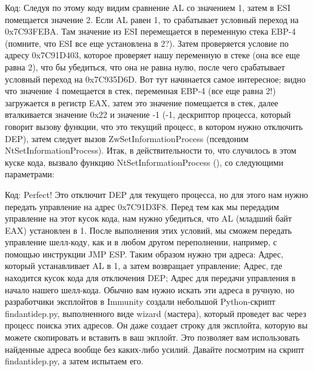\documentclass[12pt]{book}
\begin{document}
Код:
Следуя по этому коду видим сравнение AL со значением 1, затем в ESI помещается значение 2. Если AL равен 1, то срабатывает условный переход на 0x7C93FEBA. Там значение из ESI перемещается в переменную стека EBP-4 (помните, что ESI все еще установлена в 2?). Затем проверяется условие по адресу 0x7C91D403, которое проверяет нашу переменную в стеке (она все еще равна 2), что бы убедиться, что она не равна нулю, после чего срабатывает условный переход на 0x7C935D6D. Вот тут начинается самое интересное; видно что значение 4 помещается в стек, переменная EBP-4 (все еще равна 2!) загружается в регистр EAX, затем это значение помещается в стек, далее вталкивается значение 0x22 и значение -1 (-1, дескриптор процесса, который говорит вызову функции, что это текущий процесс, в котором нужно отключить DEP), затем следует вызов ZwSetInformationProcess (псевдоним NtSetInformationProcess). Итак, в действительности то, что случилось в этом куске кода, вызвало функцию NtSetInformationProcess (), со следующими параметрами:

Код:
Perfect! Это отключит DEP для текущего процесса, но для этого нам нужно передать управление на адрес 0x7C91D3F8. Перед тем как мы передадим управление на этот кусок кода, нам нужно убедиться, что AL (младший байт EAX) установлен в 1. После выполнения этих условий, мы сможем передать управление шелл-коду, как и в любом другом переполнении, например, с помощью инструкции JMP ESP. Таким образом нужно три адреса:
Адрес, который устанавливает AL в 1, а затем возвращает управление;
Адрес, где находится кусок кода для отключения DEP;
Адрес для передачи управления в начало нашего шелл-кода.
Обычно вам нужно искать эти адреса в ручную, но разработчики эксплойтов в Immunity создали небольшой Python-скрипт findantidep.py, выполненного виде wizard (мастера), который проведет вас через процесс поиска этих адресов. Он даже создает строку для эксплойта, которую вы можете скопировать и вставить в ваш экплойт. Это позволяет вам использовать найденные адреса вообще без каких-либо усилий. Давайте посмотрим на скрипт findantidep.py, а затем испытаем его.
\end{document}
